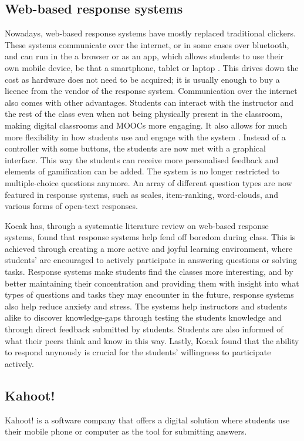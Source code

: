 \subsection{Web-based response systems}
Nowadays, web-based response systems have mostly replaced traditional clickers. These systems communicate over the internet, or in some cases over bluetooth, and can run in the a browser or as an app, which allows students to use their own mobile device, be that a smartphone, tablet or laptop \cite{resyslitrev}. This drives down the cost as hardware does not need to be acquired; it is usually enough to buy a licence from the vendor of the response system. Communication over the internet also comes with other advantages. Students can interact with the instructor and the rest of the class even when not being physically present in the classroom, making digital classrooms and MOOCs more engaging. It also allows for much more flexibility in how students use and engage with the system \cite{resyslitrev}. Instead of a controller with some buttons, the students are now met with a graphical interface. This way the students can receive more personalised feedback and elements of gamification can be added. The system is no longer restricted to multiple-choice questions anymore. An array of different question types are now featured in response systems, such as scales, item-ranking, word-clouds, and various forms of open-text responses.

Kocak \cite{resyslitrev} has, through a systematic literature review on web-based response systems, found that response systems help fend off boredom during class. This is achieved through creating a more active and joyful learning environment, where students' are encouraged to actively participate in answering questions or solving tasks. Response systems make students find the classes more interesting, and by better maintaining their concentration and providing them with insight into what types of questions and tasks they may encounter in the future, response systems also help reduce anxiety and stress. The systems help instructors and students alike to discover knowledge-gaps through testing the students knowledge and through direct feedback submitted by students. Students are also informed of what their peers think and know in this way. Lastly, Kocak found that the ability to respond anynously is crucial for the students' willingness to participate actively. 

\subsection{Kahoot!}
Kahoot! is a software company that offers a digital solution where students use their mobile phone or computer as the tool for submitting answers.

